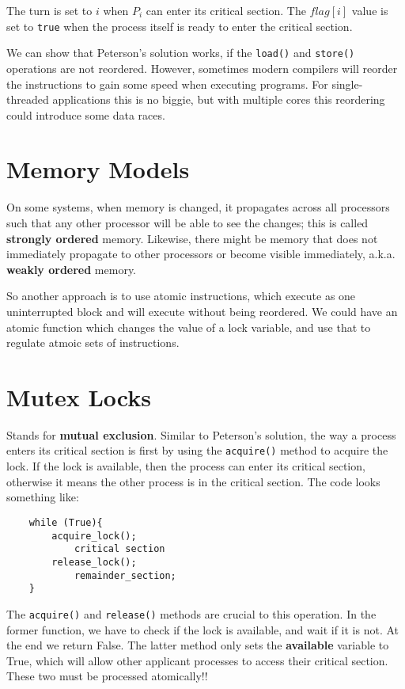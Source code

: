 \documentclass{tufte-handout}
\begin{document}
The turn is set to $i$ when $P_{i}$ can enter its critical section. The $flag[i]$ value is 
set to \texttt{true}  when the process itself is ready to enter the critical section.

We can show that Peterson's solution works, if the \texttt{load()} and \texttt{store()}
operations are not reordered. However, sometimes modern compilers will reorder the instructions
to gain some speed when executing programs. For single-threaded applications this is no biggie,
but with multiple cores this reordering could introduce some data races.

\section{Memory Models}
On some systems, when memory is changed, it propagates across all processors such that any other 
processor will be able to see the changes; this is called \textbf{strongly ordered} memory. 
Likewise, there might be memory that does not immediately propagate to other processors or become
visible immediately, a.k.a. \textbf{weakly ordered} memory.

So another approach is to use atomic instructions, which execute as one uninterrupted block and 
will execute without being reordered. We could have an atomic function which changes the value 
of a lock variable, and use that to regulate atmoic sets of instructions.

\section{Mutex Locks}
Stands for \textbf{mutual exclusion}. Similar to Peterson's solution, the way a process enters
its critical section is first by using the \texttt{acquire()} method to acquire the lock. If 
the lock is available, then the process can enter its critical section, otherwise it means
the other process is in the critical section. The code looks something like:

\begin{lstlisting}
	while (True){
		acquire_lock();
			critical section
		release_lock();
			remainder_section;
	}
\end{lstlisting}
The \texttt{acquire()} and \texttt{release()} methods are crucial to this operation. In the
former function, we have to check if the lock is available, and wait if it is not. At the end
we return False. The latter method only sets the \textbf{available} variable to True, which 
will allow other applicant processes to access their critical section. These two must 
be processed atomically!!
\end{document}
